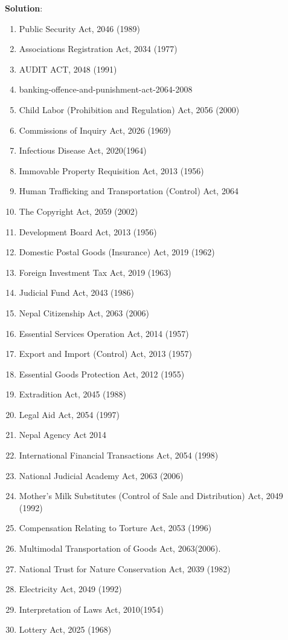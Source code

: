 \documentclass[
  openany]{book}
\newenvironment{solution}{ {\bfseries Solution}:}{}
\begin{document}
\begin{questions}
\begin{solution}
\begin{enumerate}
\item Public Security Act, 2046 (1989)
\item Associations Registration Act, 2034 (1977)
\item AUDIT ACT, 2048 (1991)
\item banking-offence-and-punishment-act-2064-2008
\item Child Labor (Prohibition and Regulation) Act, 2056 (2000)
\item Commissions of Inquiry Act, 2026 (1969)
\item Infectious Disease Act, 2020(1964)
\item Immovable Property Requisition Act, 2013 (1956)
\item Human Trafficking and Transportation (Control) Act, 2064
\item The Copyright Act, 2059 (2002)
\item Development Board Act, 2013 (1956)
\item Domestic Postal Goods (Insurance) Act, 2019 (1962)
\item Foreign Investment Tax Act, 2019 (1963)
\item Judicial Fund Act, 2043 (1986)
\item Nepal Citizenship Act, 2063 (2006)
\item Essential Services Operation Act, 2014 (1957)
\item Export and Import (Control) Act, 2013 (1957)
\item Essential Goods Protection Act, 2012 (1955)
\item Extradition Act, 2045 (1988)
\item Legal Aid Act, 2054 (1997)
\item Nepal Agency Act 2014
\item International Financial Transactions Act, 2054 (1998)
\item National Judicial Academy Act, 2063 (2006)
\item Mother's Milk Substitutes (Control of Sale and Distribution) Act, 2049 (1992)
\item Compensation Relating to Torture Act, 2053 (1996)
\item Multimodal Transportation of Goods Act, 2063(2006).
\item National Trust for Nature Conservation Act, 2039 (1982)
\item Electricity Act, 2049 (1992)
\item Interpretation of Laws Act, 2010(1954)
\item Lottery Act, 2025 (1968)

\end{enumerate}
\end{solution}
\end{questions}
\end{document}
